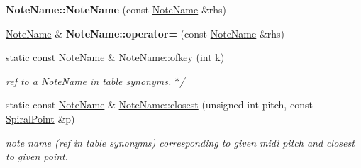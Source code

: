 \begin{DoxyCompactItemize}
\mbox{\label{group__segment_gaba2eabd0e4626b56685968ea53153b3b}} 
{\bfseries Note\+Name\+::\+Note\+Name} (const \mbox{\hyperlink{structNoteName}{Note\+Name}} \&rhs)
\item 
\mbox{\label{group__segment_ga22a391f4c1fa697f1d320d1a659f130f}} 
\mbox{\hyperlink{structNoteName}{Note\+Name}} \& {\bfseries Note\+Name\+::operator=} (const \mbox{\hyperlink{structNoteName}{Note\+Name}} \&rhs)
\item 
\mbox{\label{group__segment_ga055480a382a6fde05bde51abed31a56c}} 
static const \mbox{\hyperlink{structNoteName}{Note\+Name}} \& \mbox{\hyperlink{group__segment_ga055480a382a6fde05bde51abed31a56c}{Note\+Name\+::ofkey}} (int k)
\begin{DoxyCompactList}\small\item\em ref to a \mbox{\hyperlink{structNoteName}{Note\+Name}} in table synonyms. $\ast$/ \end{DoxyCompactList}\item 
static const \mbox{\hyperlink{structNoteName}{Note\+Name}} \& \mbox{\hyperlink{group__segment_gaf4a2321d9bc5a69a5b8a94cf1e146052}{Note\+Name\+::closest}} (unsigned int pitch, const \mbox{\hyperlink{structSpiralPoint}{Spiral\+Point}} \&p)
\begin{DoxyCompactList}\small\item\em note name (ref in table synonyms) corresponding to given midi pitch and closest to given point. \end{DoxyCompactList}\end{DoxyCompactItemize}
